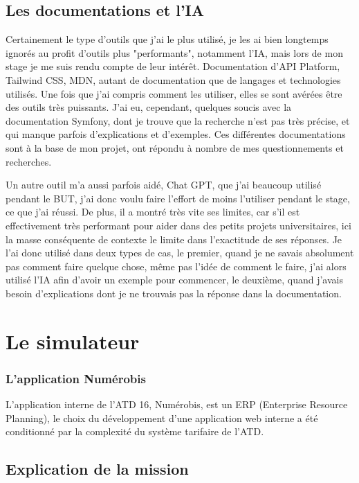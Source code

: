 \documentclass[a4paper,12pt]{report}
\begin{document}
\subsection{Les documentations et l'IA}
Certainement le type d'outils que j'ai le plus utilisé, je les ai bien longtemps ignorés au profit d'outils plus "performants", notamment l'IA, mais lors de mon stage je me suis rendu compte de leur intérêt. Documentation d'API Platform, Tailwind CSS, MDN, autant de documentation que de langages et technologies utilisés. Une fois que j'ai compris comment les utiliser, elles se sont avérées être des outils très puissants. J'ai eu, cependant, quelques soucis avec la documentation Symfony, dont je trouve que la recherche n'est pas très précise, et qui manque parfois d'explications et d'exemples. Ces différentes documentations sont à la base de mon projet, ont répondu à nombre de mes questionnements et recherches.

Un autre outil m'a aussi parfois aidé, Chat GPT, que j'ai beaucoup utilisé pendant le BUT, j'ai donc voulu faire l'effort de moins l'utiliser pendant le stage, ce que j'ai réussi. De plus, il a montré très vite ses limites, car s'il est effectivement très performant pour aider dans des petits projets universitaires, ici la masse conséquente de contexte le limite dans l'exactitude de ses réponses. Je l'ai donc utilisé dans deux types de cas, le premier, quand je ne savais absolument pas comment faire quelque chose, même pas l'idée de comment le faire, j'ai alors utilisé l'IA afin d'avoir un exemple pour commencer, le deuxième, quand j'avais besoin d'explications dont je ne trouvais pas la réponse dans la documentation.

\section{Le simulateur}
\subsubsection{L'application Numérobis}
L'application interne de l'ATD 16, Numérobis, est un ERP (Enterprise Resource Planning), le choix du développement d'une application web interne a été conditionné par la complexité du système tarifaire de l'ATD.

\subsection{Explication de la mission}
\end{document}
